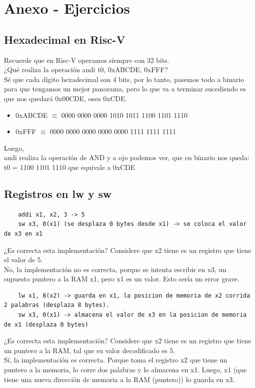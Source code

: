 \documentclass[10pt,a4paper]{article}
\begin{document}
\section*{Anexo - Ejercicios}
\subsection*{Hexadecimal en Risc-V}
Recuerde que en Risc-V operamos siempre con 32 bits. \\

¿Qué realiza la operación andi t0, 0xABCDE, 0xFFF? \\
Sé que cada dígito hexadecimal son 4 bits, por lo tanto, pasemos todo a binario para que tengamos un mejor panorama, pero lo que va a terminar sucediendo es que nos quedará 0x00CDE, osea 0xCDE. 
\begin{itemize}
    \item 0xABCDE $\equiv$ 0000  0000  0000 1010  1011  1100  1101  1110 
    \item 0xFFF $\equiv$ 0000  0000  0000  0000 0000  1111  1111  1111  
\end{itemize} 
Luego, \\
andi realiza la operación de AND y a ojo podemos ver, que en binario nos queda: t0 = 1100 1101 1110 que equivale a 0xCDE
\subsection*{Registros en lw y sw}
\label{subsec:punteros_ram_registros}
\begin{lstlisting}
    addi x1, x2, 3 -> 5
    sw x3, 0(x1) (se desplaza 0 bytes desde x1) -> se coloca el valor de x3 en x1
\end{lstlisting}
¿Es correcta esta implementación? Considere que x2 tiene es un registro que tiene el valor de 5. \\
No, la implementación no es correcta, porque se intenta escribir en x3, un supuesto puntero a la RAM x1, pero x1 es un valor. Esto sería un error grave. \\ 
\begin{lstlisting}
    lw x1, 8(x2) -> guarda en x1, la posicion de memoria de x2 corrida 2 palabras (desplaza 8 bytes).
    sw x3, 0(x1) -> almacena el valor de x3 en la posicion de memoria de x1 (desplaza 0 bytes)
\end{lstlisting}
¿Es correcta esta implementación? Considere que x2 tiene es un registro que tiene un puntero a la RAM, tal que su valor decodificado es 5. \\
Sí, la implementación es correcta. Porque toma el registro x2 que tiene un puntero a la memoria, lo corre dos palabras y lo almacena en x1. Luego, x1 (que tiene una nueva dirección de memoria a la RAM (puntero)) lo guarda en x3. \\ 
\end{document}
